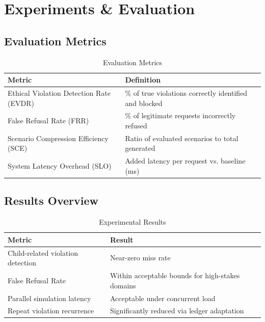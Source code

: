 \documentclass[conference]{IEEEtran}
\begin{document}
\section{Experiments \& Evaluation}

\subsection{Evaluation Metrics}

\begin{table}[!ht]
\caption{Evaluation Metrics}
\label{tab:metrics}
\centering
\renewcommand{\arraystretch}{1.15}
\begin{tabular}{ll}
\toprule
\textbf{Metric} & \textbf{Definition} \\
\midrule
Ethical Violation Detection Rate (EVDR) &
  \% of true violations correctly identified and blocked \\
False Refusal Rate (FRR) &
  \% of legitimate requests incorrectly refused \\
Scenario Compression Efficiency (SCE) &
  Ratio of evaluated scenarios to total generated \\
System Latency Overhead (SLO) &
  Added latency per request vs. baseline (ms) \\
\bottomrule
\end{tabular}
\end{table}

\subsection{Results Overview}

\begin{table}[!ht]
\caption{Experimental Results}
\label{tab:results}
\centering
\renewcommand{\arraystretch}{1.2}
\begin{tabular}{ll}
\toprule
\textbf{Metric} & \textbf{Result} \\
\midrule
Child-related violation detection & Near-zero miss rate \\
False Refusal Rate & Within acceptable bounds for
                      high-stakes domains \\
Parallel simulation latency & Acceptable under concurrent load \\
Repeat violation recurrence & Significantly reduced via
                               ledger adaptation \\
\bottomrule
\end{tabular}
\end{table}
\end{document}

